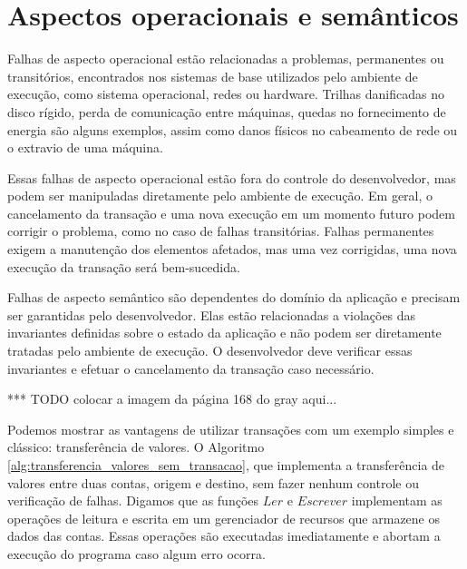 \documentclass[11pt,twoside,a4paper]{book}
\begin{document}
\section{Aspectos operacionais e semânticos}
\label{sec:aspectos_operacionais_e_semanticos}

Falhas de aspecto operacional estão relacionadas a problemas, permanentes ou transitórios, encontrados nos sistemas de base utilizados pelo ambiente de execução, como sistema operacional, redes ou hardware. Trilhas danificadas no disco rígido, perda de comunicação entre máquinas, quedas no fornecimento de energia são alguns exemplos, assim como danos físicos no cabeamento de rede ou o extravio de uma máquina.

Essas falhas de aspecto operacional estão fora do controle do desenvolvedor, mas podem ser manipuladas diretamente pelo ambiente de execução. Em geral, o cancelamento da transação e uma nova execução em um momento futuro podem corrigir o problema, como no caso de falhas transitórias. Falhas permanentes exigem a manutenção dos elementos afetados, mas uma vez corrigidas, uma nova execução da transação será bem-sucedida.


Falhas de aspecto semântico são dependentes do domínio da aplicação e precisam ser garantidas pelo desenvolvedor. Elas estão relacionadas a violações das invariantes definidas sobre o estado da aplicação e não podem ser diretamente tratadas pelo ambiente de execução. O desenvolvedor deve verificar essas invariantes e efetuar o cancelamento da transação caso necessário.

*** TODO colocar a imagem da página 168 do gray aqui...

Podemos mostrar as vantagens de utilizar transações com um exemplo simples e clássico: transferência de valores. O Algoritmo \ref{alg:transferencia_valores_sem_transacao}, que implementa a transferência de valores entre duas contas, origem e destino, sem fazer nenhum controle ou verificação de falhas. Digamos que as funções $Ler$ e $Escrever$ implementam as operações de leitura e escrita em um gerenciador de recursos que armazene os dados das contas. Essas operações são executadas imediatamente e abortam a execução do programa caso algum erro ocorra.
\end{document}
